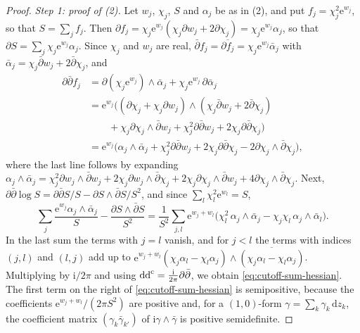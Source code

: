\begin{proof}
\emph{Step 1: proof of \textup{(2)}.} Let $w_j$, $\chi_j$, $S$ and $\alpha_j$ be as in (2), and put $f_j=\chi_j^2\mathrm e^{w_j}$, so that $S=\sum_jf_j$. Then $\partial f_j=\chi_j\mathrm e^{w_j}(\chi_j\partial w_j+2\partial\chi_j)=\chi_j\mathrm e^{w_j}\alpha_j$, so that $\partial S=\sum_j\chi_j\mathrm e^{w_j}\alpha_j$. Since $\chi_j$ and $w_j$ are real, $\bar\partial f_j=\overline{\partial f_j}=\chi_j\mathrm e^{w_j}\bar\alpha_j$ with $\bar\alpha_j=\chi_j\bar\partial w_j+2\bar\partial\chi_j$, and
\[
 \begin{aligned}
 \partial\bar\partial f_j&=\partial(\chi_j\mathrm e^{w_j})\wedge\bar\alpha_j+\chi_j\mathrm e^{w_j}\,\partial\bar\alpha_j\\
 &=\mathrm e^{w_j}\bigl((\partial\chi_j+\chi_j\partial w_j)\wedge(\chi_j\bar\partial w_j+2\bar\partial\chi_j)\\
 &\qquad+\chi_j\partial\chi_j\wedge\bar\partial w_j+\chi_j^2\partial\bar\partial w_j+2\chi_j\partial\bar\partial\chi_j\bigr)\\
 &=\mathrm e^{w_j}\bigl(\alpha_j\wedge\bar\alpha_j+\chi_j^2\partial\bar\partial w_j+2\chi_j\partial\bar\partial\chi_j-2\partial\chi_j\wedge\bar\partial\chi_j\bigr),
 \end{aligned}
\]
where the last line follows by expanding $\alpha_j\wedge\bar\alpha_j=\chi_j^2\partial w_j\wedge\bar\partial w_j+2\chi_j\partial w_j\wedge\bar\partial\chi_j+2\chi_j\partial\chi_j\wedge\bar\partial w_j+4\partial\chi_j\wedge\bar\partial\chi_j$. Next, $\partial\bar\partial\log S=\partial\bar\partial S/S-\partial S\wedge\bar\partial S/S^2$, and since $\sum_l\chi_l^2\mathrm e^{w_l}=S$,
\[
 \sum_j\frac{\mathrm e^{w_j}\alpha_j\wedge\bar\alpha_j}S-\frac{\partial S\wedge\bar\partial S}{S^2}
 =\frac1{S^2}\sum_{j,l}\mathrm e^{w_j+w_l}\bigl(\chi_l^2\,\alpha_j\wedge\bar\alpha_j-\chi_j\chi_l\,\alpha_j\wedge\bar\alpha_l\bigr).
\]
In the last sum the terms with $j=l$ vanish, and for $j<l$ the terms with indices $(j,l)$ and $(l,j)$ add up to $\mathrm e^{w_j+w_l}(\chi_j\alpha_l-\chi_l\alpha_j)\wedge\overline{(\chi_j\alpha_l-\chi_l\alpha_j)}$. Multiplying by $\mathrm i/2\pi$ and using $\mathrm{dd}^{\mathrm{c}}=\frac{\mathrm i}{2\pi}\partial\bar\partial$, we obtain \eqref{eq:cutoff-sum-hessian}. The first term on the right of \eqref{eq:cutoff-sum-hessian} is semipositive, because the coefficients $\mathrm e^{w_j+w_l}/(2\pi S^2)$ are positive and, for a $(1,0)$-form $\gamma=\sum_k\gamma_k\,\mathrm dz_k$, the coefficient matrix $(\gamma_k\bar\gamma_{k'})$ of $\mathrm i\gamma\wedge\bar\gamma$ is positive semidefinite.


\end{proof}
